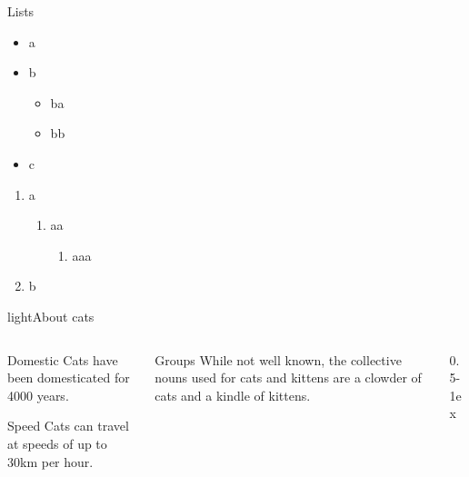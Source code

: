 \documentclass[aspectratio=169]{beamer}
\begin{document}
\begin{frame}{Lists}

  \begin{itemize}
    \item a
    \item b
      \begin{itemize}
        \item ba
        \item bb
      \end{itemize}
    \item c
  \end{itemize}

  \begin{enumerate}
    \item a
      \begin{enumerate}
        \item aa
          \begin{enumerate}
            \item aaa
          \end{enumerate}
      \end{enumerate}
    \item b
  \end{enumerate}
\end{frame}

\begin{picframe}[lightbw]{light}{About cats}
  \begin{columns}[t,onlytextwidth]
    \begin{column}{0.25\textwidth}
      \begin{block}{Domestic}
        Cats have been domesticated for 4000 years.
      \end{block}
      \begin{block}{Speed}
        Cats can travel at speeds of up to 30km per hour.
      \end{block}
    \end{column}
    \begin{column}{0.25\textwidth}
      \begin{block}{Groups}
        While not well known, the collective nouns used for cats and kittens are a clowder of cats and a kindle of kittens.
      \end{block}
    \end{column}
    \begin{column}{0.5\textwidth-1ex}
    \end{column}
  \end{columns}
\end{picframe}
\end{document}
